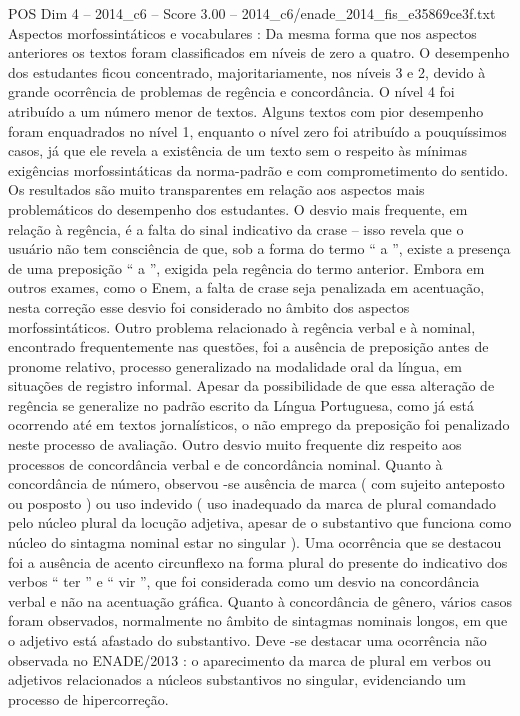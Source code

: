 \begin{textsample}{POS Dim 4 – 2014\_c6 – Score 3.00 – 2014\_c6/enade\_2014\_fis\_e35869ce3f.txt}
Aspectos morfossintáticos e vocabulares : Da mesma forma que nos aspectos anteriores os textos foram classificados em níveis de zero a quatro.
O desempenho dos estudantes ficou concentrado, majoritariamente, nos níveis 3 e 2, devido à grande ocorrência de problemas de regência e concordância.
O nível 4 foi atribuído a um número menor de textos.
Alguns textos com pior desempenho foram enquadrados no nível 1, enquanto o nível zero foi atribuído a pouquíssimos casos, já que ele revela a existência de um texto sem o respeito às mínimas exigências morfossintáticas da norma-padrão e com comprometimento do sentido.
Os resultados são muito transparentes em relação aos aspectos mais problemáticos do desempenho dos estudantes.
O desvio mais frequente, em relação à regência, é a falta do sinal indicativo da crase – isso revela que o usuário não tem consciência de que, sob a forma do termo “ a ”, existe a presença de uma preposição “ a ”, exigida pela regência do termo anterior.
Embora em outros exames, como o Enem, a falta de crase seja penalizada em acentuação, nesta correção esse desvio foi considerado no âmbito dos aspectos morfossintáticos.
Outro problema relacionado à regência verbal e à nominal, encontrado frequentemente nas questões, foi a ausência de preposição antes de pronome relativo, processo generalizado na modalidade oral da língua, em situações de registro informal.
Apesar da possibilidade de que essa alteração de regência se generalize no padrão escrito da Língua Portuguesa, como já está ocorrendo até em textos jornalísticos, o não emprego da preposição foi penalizado neste processo de avaliação.
Outro desvio muito frequente diz respeito aos processos de concordância verbal e de concordância nominal.
Quanto à concordância de número, observou -se ausência de marca ( com sujeito anteposto ou posposto ) ou uso indevido ( uso inadequado da marca de plural comandado pelo núcleo plural da locução adjetiva, apesar de o substantivo que funciona como núcleo do sintagma nominal estar no singular ).
Uma ocorrência que se destacou foi a ausência de acento circunflexo na forma plural do presente do indicativo dos verbos “ ter ” e “ vir ”, que foi considerada como um desvio na concordância verbal e não na acentuação gráfica.
Quanto à concordância de gênero, vários casos foram observados, normalmente no âmbito de sintagmas nominais longos, em que o adjetivo está afastado do substantivo.
Deve -se destacar uma ocorrência não observada no ENADE/2013 : o aparecimento da marca de plural em verbos ou adjetivos relacionados a núcleos substantivos no singular, evidenciando um processo de hipercorreção.

\end{textsample}
